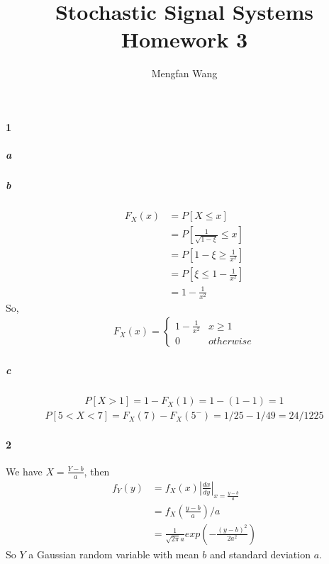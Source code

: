 \documentclass[22pt]{article}
\author{Mengfan Wang}
\title{Stochastic Signal Systems Homework 3}
\begin{document}
		\maketitle 
	\paragraph{1}
		\subparagraph{a}\begin{figure}[H]
				\centering
			\end{figure}

		\subparagraph{b} \begin{align}
		F_X(x) & = P[X\leq x]\\
		& = P[\frac{1}{\sqrt{1- \xi}}\leq x]\\
		& = P[1- \xi \geq \frac{1}{x^2}]\\
		& = P[\xi \leq 1-\frac{1}{x^2}]\\
		& = 1 -\frac{1}{x^2}
		\end{align}
		So, \begin{align}
	F_X(x) = 
				\begin{cases}
				1 -\frac{1}{x^2} & x \geq 1\\
				0 & otherwise
				\end{cases}
	\end{align}
		\subparagraph{c}
		\begin{align}
		P[X>1] = 1 -F_X(1) = 1 - (1-1) = 1
		\end{align}
		\begin{align}
		P[5<X<7] = F_X(7) - F_X(5^-) = 1/25-1/49 = 24/1225
		\end{align}

	\paragraph{2} We have $X = \frac{Y-b}{a}$, then 
	\begin{align}
	f_Y(y) & = f_X(x)|\frac{dx}{dy}|_{x = \frac{y-b}{a}}\\
		   & = f_X(\frac{y-b}{a})/a\\
		   & = \frac{1}{\sqrt{2 \pi}a}exp(-\frac{(y-b)^2}{2a^2})
	\end{align}
	So $Y$ a Gaussian random variable with mean $b$ and standard deviation $a$.
\end{document}
